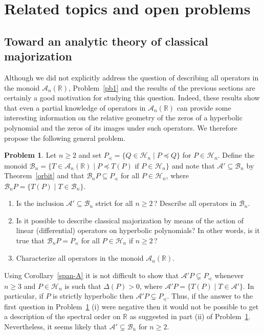 \documentclass[10pt,twoside,a4paper,reqno]{amsart}
\theoremstyle{plain}
\theoremstyle{definition}
\newtheorem{problem}         {Problem}
\theoremstyle{remark}
\newcommand {\bR} {\mathbb {R}}
\newcommand {\De} {\Delta}
\newcommand {\calH} {\mathcal {H}}
\newcommand {\calA} {\mathcal {A}}
\newcommand {\calB} {\mathcal {B}}
\begin{document}
\section{Related topics and open problems}

\subsection{Toward an analytic theory of classical majorization}

Although we did not explicitly address the question of describing all 
operators in the monoid $\calA_n(\bR)$, Problem~\ref{pb1} and the results of 
the previous sections are certainly a good motivation for studying this 
question. Indeed, these results show that even a partial knowledge of 
operators in $\calA_n(\bR)$ can provide some interesting information on the 
relative geometry of the zeros of a hyperbolic polynomial and the zeros of its 
images under such operators. We therefore propose the following general 
problem.

\begin{problem}\label{pb2}
Let $n\ge 2$ and set 
$P_{\preccurlyeq}=\big\{Q\in \calH_n\mid P\preccurlyeq Q\big\}$ for 
$P\in \calH_n$. Define the monoid 
$\calB_n=\big\{T\in \calA_n(\bR)\mid P\preccurlyeq T(P)
\text{ if }P\in \calH_n\big\}$ and note that $\calA'\subseteq \calB_n$ by 
Theorem~\ref{orbit} and that $\calB_nP\subseteq P_{\preccurlyeq}$ for all 
$P\in \calH_n$, where $\calB_nP=\big\{T(P)\mid T\in \calB_n\big\}$.
\begin{enumerate}
\item[(i)] Is the inclusion 
$\calA'\subseteq \calB_n$ strict for all $n\ge 2\,$?  Describe all 
operators in $\calB_n$. 
\item[(ii)] Is it possible to describe classical majorization by means of 
the action of linear (differential) operators on hyperbolic polynomials? In 
other words, is it true that $\calB_nP=P_{\preccurlyeq}$ for all 
$P\in \calH_n$ if $n\ge 2\,$?
\item[(iii)] Characterize all operators in the monoid $\calA_n(\bR)$.
\end{enumerate}
\end{problem}

Using Corollary~\ref{span-A} it is not difficult to show that 
$\calA' P\subsetneq P_{\preccurlyeq}$ whenever $n\ge 3$ and $P\in \calH_n$ is 
such that $\De(P)>0$, where $\calA' P=\big\{T(P)\mid T\in \calA'\big\}$. 
In particular, if $P$ is strictly hyperbolic then 
$\calA' P\subsetneq P_{\preccurlyeq}$. Thus, if the answer to the first 
question in Problem~\ref{pb2} (i) were negative then it would not be possible 
to get a description of the spectral order on $\bR$ as suggested in part (ii) 
of Problem~\ref{pb2}. Nevertheless, it seems likely that 
$\calA'\subsetneq \calB_n$ for $n\ge 2$. 
\end{document}
